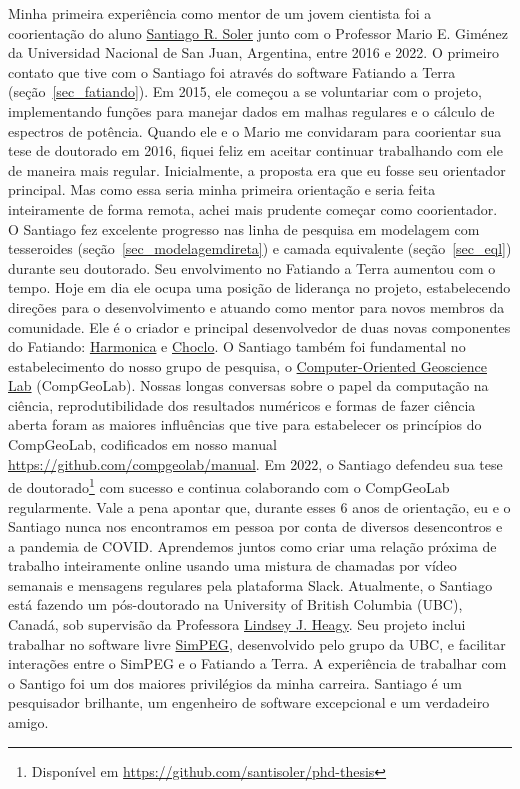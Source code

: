 \documentclass[12pt,a4paper,oneside]{book}
\newcommand{\SantiagoLink}{\href{https://www.santisoler.com/}{Santiago R. Soler}}
\begin{document}
Minha primeira experiência como mentor de um jovem cientista foi a coorientação
do aluno \SantiagoLink{} junto com o
Professor Mario E. Giménez da Universidad Nacional de San Juan, Argentina,
entre 2016 e 2022.
O primeiro contato que tive com o Santiago foi através do software
Fatiando a Terra (seção~\ref{sec_fatiando}).
Em 2015, ele começou a se voluntariar com o projeto, implementando funções
para manejar dados em malhas regulares e o cálculo de espectros de potência.
Quando ele e o Mario me convidaram para coorientar sua tese de doutorado em
2016, fiquei feliz em aceitar continuar trabalhando com ele de maneira mais
regular.
Inicialmente, a proposta era que eu fosse seu orientador principal.
Mas como essa seria minha primeira orientação e seria feita inteiramente de
forma remota, achei mais prudente começar como coorientador.
O Santiago fez excelente progresso nas linha de pesquisa em modelagem com
tesseroides (seção~\ref{sec_modelagemdireta}) e camada equivalente
(seção~\ref{sec_eql}) durante seu doutorado.
Seu envolvimento no Fatiando a Terra aumentou com o tempo. Hoje em dia ele
ocupa uma posição de liderança no projeto, estabelecendo direções para o
desenvolvimento e atuando como mentor para novos membros da comunidade.
Ele é o criador e principal desenvolvedor de duas novas componentes do
Fatiando: \href{https://www.fatiando.org/harmonica}{Harmonica} e
\href{https://www.fatiando.org/choclo/}{Choclo}.
O Santiago também foi fundamental no estabelecimento do nosso grupo de pesquisa,
o \href{https://www.compgeolab.org/}{Computer-Oriented Geoscience Lab}
(CompGeoLab).
Nossas longas conversas sobre o papel da computação na ciência,
reprodutibilidade dos resultados numéricos e formas de fazer ciência aberta
foram as maiores influências que tive para estabelecer os princípios do
CompGeoLab, codificados em nosso manual
\url{https://github.com/compgeolab/manual}.
Em 2022, o Santiago defendeu sua tese de doutorado\footnote{Disponível em
\url{https://github.com/santisoler/phd-thesis}} com sucesso e continua
colaborando com o CompGeoLab regularmente.
Vale a pena apontar que, durante esses 6 anos de orientação, eu e o Santiago
nunca nos encontramos em pessoa por conta de diversos desencontros e a pandemia
de COVID.
Aprendemos juntos como criar uma relação próxima de trabalho inteiramente
online usando uma mistura de chamadas por vídeo semanais e mensagens regulares
pela plataforma Slack.
Atualmente, o Santiago está fazendo um pós-doutorado na University of British
Columbia (UBC), Canadá, sob supervisão da Professora
\href{https://lindseyjh.ca/}{Lindsey J. Heagy}.
Seu projeto inclui trabalhar no software livre
\href{https://simpeg.xyz/}{SimPEG}, desenvolvido pelo grupo da UBC, e facilitar
interações entre o SimPEG e o Fatiando a Terra.
A experiência de trabalhar com o Santigo foi um dos maiores privilégios da
minha carreira.
Santiago é um pesquisador brilhante, um engenheiro de software excepcional
e um verdadeiro amigo.
\end{document}
